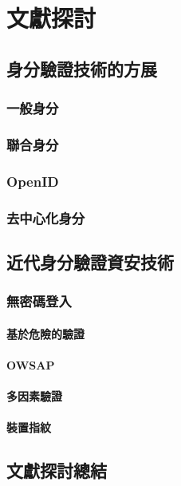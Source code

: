 
\chapter{文獻探討}

\section{身分驗證技術的方展}

\subsection{一般身分}

\subsection{聯合身分}

\subsection{OpenID}

\subsection{去中心化身分}

\section{近代身分驗證資安技術}

\subsection{無密碼登入}

\subsubsection{基於危險的驗證}

\subsubsection{OWSAP}

\subsubsection{多因素驗證}

\subsubsection{裝置指紋}

\section{文獻探討總結}